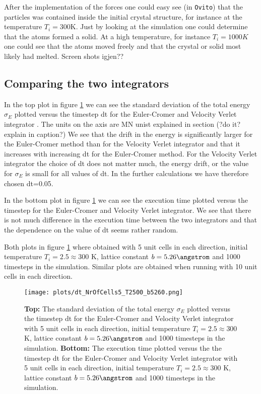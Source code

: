 \documentclass[11pt,a4wide]{article}
\begin{document}
After the implementation of the forces one could easy see (in \texttt{Ovito}) that the particles was contained inside the initial crystal structure, for instance at the temperature $T_i =300$K. Just by looking at the simulation one could determine that the atoms formed a solid. At a high temperature, for instance $T_i = 1000K$ one could see that the atoms moved freely and that the crystal or solid most likely had melted. Screen shots igjen??


\subsection{Comparing the two integrators} \label{sec: integrators_results}

In the top plot in figure \ref{fig: dt} we can see the standard deviation of the total energy $\sigma_E$ plotted versus the timestep dt for the Euler-Cromer and Velocity Verlet integrator . The units on the axis are MN unist explained in section (?do it? explain in caption?) We see that the drift in the energy is significantly larger for the Euler-Cromer method than for the Velocity Verlet integrator and that it increases with increasing dt for the Euler-Cromer method. For the Velocity Verlet integrator the choice of dt does not matter much, the energy drift, or the value for $\sigma_E$ is small for all values of dt. In the further calculations we have therefore chosen dt=0.05.  

In the bottom plot in figure \ref{fig: dt} we can see the execution time plotted versus the timestep for the Euler-Cromer and Velocity Verlet integrator. We see that there is not much difference in the execution time between the two integrators and that the dependence on the value of dt seems rather random. 

Both plots in figure \ref{fig: dt} where obtained with 5 unit cells in each direction, initial temperature $T_i = 2.5 \approx 300$ K, lattice constant $b=5.26 \angstrom$ and 1000 timesteps in the simulation. Similar plots are obtained when running with 10 unit cells in each direction. 

\begin{figure}[htp]
\centering
\texttt{[image: plots/dt\_NrOfCells5\_T2500\_b5260.png]}
\caption{\textbf{Top:} The standard deviation of the total energy $\sigma_E$ plotted versus the timestep dt for the Euler-Cromer and Velocity Verlet integrator with 5 unit cells in each direction, initial temperature $T_i = 2.5 \approx 300$ K, lattice constant $b=5.26 \angstrom$ and 1000 timesteps in the simulation. \textbf{Bottom:} The execution time plotted versus the the timestep dt for the Euler-Cromer and Velocity Verlet integrator with 5 unit cells in each direction, initial temperature $T_i = 2.5 \approx 300$ K, lattice constant $b=5.26 \angstrom$ and 1000 timesteps in the simulation.}
\label{fig: dt}
\end{figure}
\end{document}
